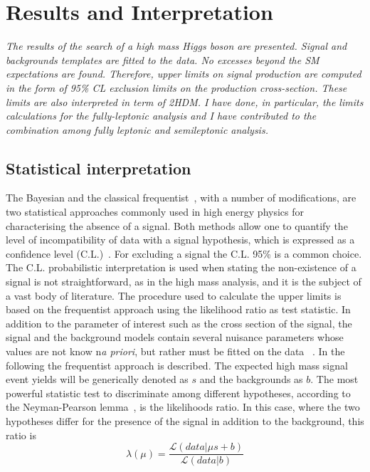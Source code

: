 \chapter{Results and Interpretation}
\label{cap7}

\textit{The results of the search of a high mass Higgs boson are presented. Signal and backgrounds templates are fitted to the data. No excesses beyond the SM expectations are found. Therefore, upper limits on signal production are computed in the form of 95\% CL exclusion limits on the production cross-section. These limits are also interpreted in term of 2HDM. I have done, in particular, the limits calculations for the 
fully-leptonic analysis and I have contributed to the combination among fully leptonic and semileptonic analysis. }

\section{Statistical interpretation}
\label{StatIn}
The Bayesian and the classical frequentist~\cite{cowan1998statistical}, with a number of modifications, are two statistical approaches commonly used in high energy physics for characterising the absence
of a signal.
Both methods allow one to quantify the level of incompatibility of data with a signal
hypothesis,  which  is  expressed  as  a  confidence  level  (C.L.)~\cite{CMS-NOTE-2011-005}. For excluding a signal the C.L. 95\% is a common choice.
The C.L. probabilistic interpretation is used when stating the non-existence
of a signal is not straightforward, as in the high mass analysis, and it is the subject of a vast body of literature.
The procedure used to calculate the upper limits is based on the frequentist approach using the likelihood ratio as test statistic. In addition to the parameter of interest such as the cross section of the signal, the signal and the background models contain several nuisance parameters whose values are not know n\textit{a priori}, but rather must be fitted on the data ~\cite{Cowan:2010js}.
In the following the frequentist approach is described.  The expected high mass signal  event yields will be generically denoted as $s$ and the backgrounds as $b$.
\newline
The most powerful statistic test to discriminate among different hypotheses, according to the Neyman-Pearson lemma~\cite{cowan1998statistical}, is the likelihoods ratio. In this case, where the two hypotheses differ for the presence of the signal in addition to the background, this ratio is  
\begin{equation}
  \lambda (\mu)=\frac{\mathcal{L}(data | \mu s +b)  }{ \mathcal{L}(data | b) }  \end{equation}

